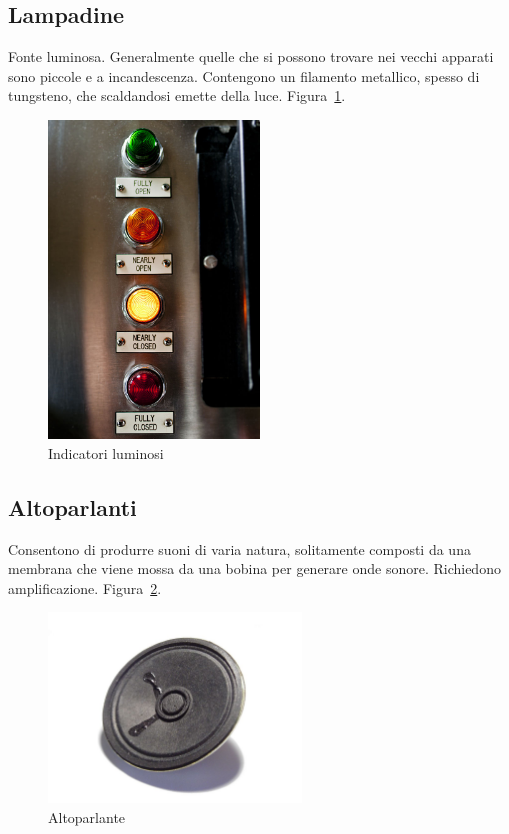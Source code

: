 \documentclass[12pt,a4paper]{report}
\begin{document}
\subsection{Lampadine}
Fonte luminosa. Generalmente quelle che si possono trovare nei vecchi apparati sono piccole e a incandescenza. Contengono un filamento
metallico, spesso di tungsteno, che scaldandosi emette della luce. Figura~\ref{fig:indicatorlights}.

\begin{figure}[h]
  \centering
  \includegraphics[width=0.5\textwidth]{indicatorlights}
  \caption{Indicatori luminosi \cite{wiki:indicatorlights}}
  \label{fig:indicatorlights}
\end{figure}

\subsection{Altoparlanti}
Consentono di produrre suoni di varia natura, solitamente composti da una membrana che viene mossa da una bobina per generare onde
sonore. Richiedono amplificazione. Figura~\ref{fig:speaker}.

\begin{figure}[h]
  \centering
  \includegraphics[width=0.6\textwidth]{speaker}
  \caption{Altoparlante \cite{wiki:speaker}}
  \label{fig:speaker}
\end{figure}
\end{document}
